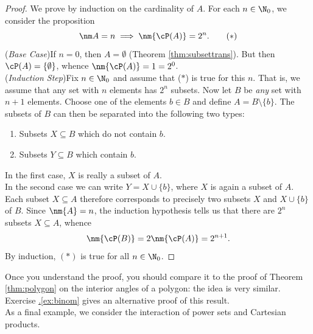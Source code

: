 \begin{proof}
We prove by induction on the cardinality of $A$. For each $n\in\N_0$, we consider the proposition
\[\nm A=n\implies\nm{\cP(A)}=2^n.\tag*{($\ast$)}\]
(\emph{Base Case})\quad If $n=0$, then $A=\emptyset$ (Theorem \hyperlink{thm:subsettranslnk}{\ref*{thm:subsettrans}}). But then $\cP(A)=\{\emptyset\}$, whence $\nm{\cP(A)}=1=2^0$.\\
(\emph{Induction Step})\quad Fix $n\in\N_0$ and assume that ($\ast$) is true for this $n$. That is, we assume that any set with $n$ elements has $2^n$ subsets. Now let $B$ be \emph{any} set with $n+1$ elements. Choose one of the elements $b\in B$ and define $A=B\setminus\{b\}$. The subsets of $B$ can then be separated into the following two types:
\begin{enumerate}\itemsep0pt
  \item Subsets $X\subseteq B$ which do not contain $b$.
  \item Subsets $Y\subseteq B$ which contain $b$.
\end{enumerate}
In the first case, $X$ is really a subset of $A$.\\
In the second case we can write $Y=X\cup\{b\}$, where $X$ is again a subset of $A$.\\
Each subset $X\subseteq A$ therefore corresponds to precisely two subsets $X$ and $X\cup\{b\}$ of $B$. Since $\nm{A}=n$, the induction hypothesis tells us that there are $2^n$ subsets $X\subseteq A$, whence
\[\nm{\cP(B)}=2\nm{\cP(A)}=2^{n+1}.\]
By induction, $(\ast)$ is true for all $n\in\N_0$.
\end{proof}

\noindent Once you understand the proof, you should compare it to the proof of Theorem \ref{thm:polygon} on the interior angles of a polygon: the idea is very similar. Exercise \hyperref[ex:binom]{\thesubsection.\ref*{ex:binom}} gives an alternative proof of this result.\\

\noindent As a final example, we consider the interaction of power sets and Cartesian products.


